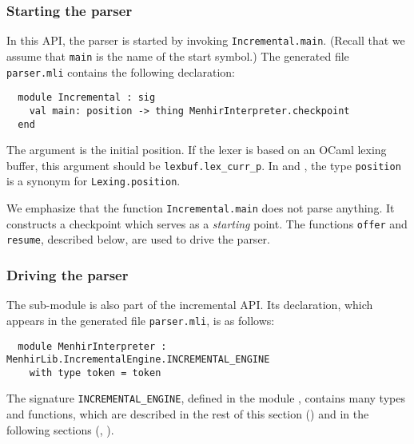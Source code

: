 \documentclass[onecolumn,11pt,nocopyrightspace,preprint]{sigplanconf}
\begin{document}



\subsubsection{Starting the parser}

In this API, the parser is started by invoking
\verb+Incremental.main+. (Recall that we assume that \verb+main+ is
the name of the start symbol.) The generated file \texttt{parser.mli} contains
the following declaration:
\begin{verbatim}
  module Incremental : sig
    val main: position -> thing MenhirInterpreter.checkpoint
  end
\end{verbatim}
The argument is the initial position. If the lexer is based on an OCaml
lexing buffer, this argument should be \verb+lexbuf.lex_curr_p+.
In  and ,
the type \verb+position+ is a synonym for \verb+Lexing.position+.

We emphasize that the function \verb+Incremental.main+ does not parse
anything. It constructs a checkpoint which serves as a \emph{starting}
point. The functions \verb+offer+ and \verb+resume+, described below, are used
to drive the parser.


\subsubsection{Driving the parser}
\label{sec:incremental:driving}

The sub-module \menhirinterpreter is also part of the incremental API.
Its declaration, which appears in the generated file \texttt{parser.mli}, is as
follows:
\begin{verbatim}
  module MenhirInterpreter : MenhirLib.IncrementalEngine.INCREMENTAL_ENGINE
    with type token = token
\end{verbatim}
The signature \verb+INCREMENTAL_ENGINE+, defined in the module
\menhirlibincrementalengine, contains many types and functions,
which are described in the rest of this section
() and in the following sections
(, ).
\end{document}
